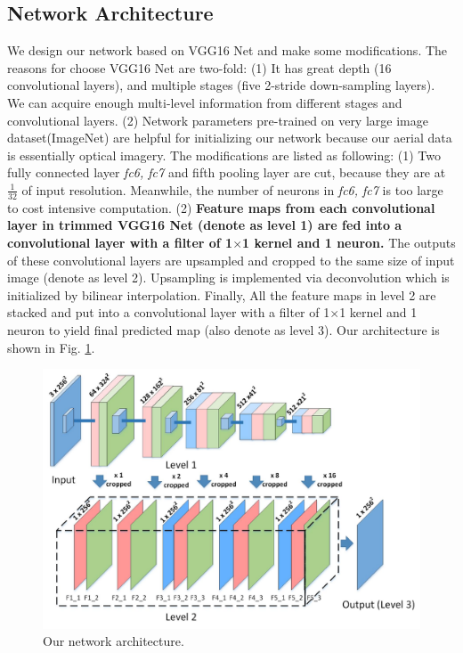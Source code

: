 \documentclass[runningheads]{llncs}
\begin{document}
\subsection{Network Architecture} 
   We design our network based on VGG16 Net\cite{Simonyan2014Very} and make some modifications. The reasons for choose VGG16 Net are two-fold: (1) It has great depth (16 convolutional layers), and multiple stages (five 2-stride down-sampling layers). We can acquire enough multi-level information from different stages and convolutional layers. (2) Network parameters pre-trained on very large image dataset(ImageNet) are helpful for initializing our network  because our aerial data is essentially optical imagery.  The modifications are listed as following: (1) Two fully connected layer \textit{fc6, fc7} and fifth pooling layer are cut, because they are at $\frac{1}{32}$ of input resolution. Meanwhile, the number of neurons in \textit{fc6, fc7} is too large to cost intensive computation. (2) \textbf{Feature maps from each convolutional layer in trimmed VGG16 Net (denote as level 1) are fed into a convolutional layer with a filter of 1$\times$1 kernel and 1 neuron.} The outputs of these convolutional layers are upsampled and cropped to the same size of input image (denote as level 2). Upsampling is implemented via deconvolution which is initialized by bilinear interpolation.   Finally, All the  feature maps in level 2 are stacked and put into a convolutional layer with a filter of 1$\times$1 kernel and 1 neuron to yield final predicted map (also denote as level 3). Our architecture is shown in Fig. \ref{fig:hierarchicalFCN}.
 
\begin{figure}
\centering
\includegraphics[width=120mm]{hierarchicalFCN4}
\caption{Our network architecture.}
\label{fig:hierarchicalFCN}
\end{figure}
\end{document}
